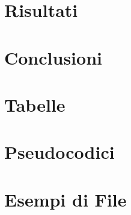\documentclass[a4paper,12pt, oneside]{book}
\begin{document}













\chapter{Risultati}





\chapter{Conclusioni}





\appendix
\chapter{Tabelle}

\chapter{Pseudocodici}

\chapter{Esempi di File}



\end{document}
